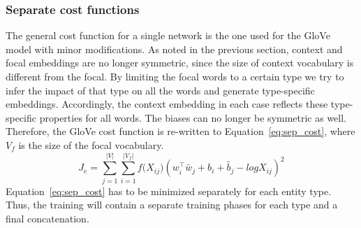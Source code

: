 \subsubsection{Separate cost functions}
\label{sec:normal_cost}

The general cost function for a single network is the one used for the GloVe model with minor modifications.
As noted in the previous section, context and focal embeddings are no longer symmetric, since the size of context vocabulary is different from the focal. 
By limiting the focal words to a certain type we try to infer the impact of that type on all the words and generate type-specific embeddings. Accordingly, the context embedding in each case reflects these type-specific properties for all words. The biases can no longer be symmetric as well. Therefore, the GloVe cost function is re-written to Equation~\ref{eq:sep_cost}, where $V_f$ is the size of the focal vocabulary.
\begin{equation}
J_e=\sum _{ j=1 }^{ |V| }{}\sum _{ i=1 }^{ |V_f| }{ f({ X }_{ ij } } )(w_{ i }^{ \top }\tilde{  w_{ j } } +b_{ i }+\tilde{  b_{ j } } -log{ X }_{ ij })^2
\label{eq:sep_cost}
\end{equation}
Equation~\ref{eq:sep_cost} has to be minimized separately for each entity type. Thus, the training will contain a separate training phases for each type and a final concatenation. 
